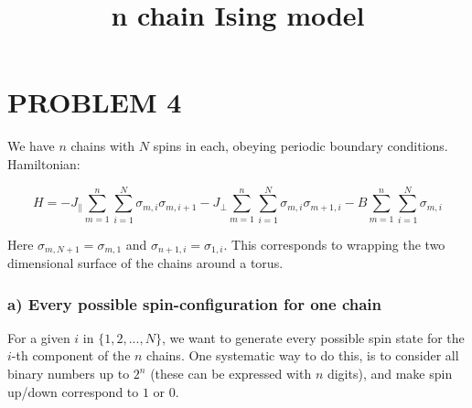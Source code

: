 \documentclass[11pt]{article}
\title{n chain Ising model}
\begin{document}
    
    
    \maketitle
    
    

    
    \section{PROBLEM 4}\label{problem-4}

    We have \(n\) chains with \(N\) spins in each, obeying periodic boundary
conditions. Hamiltonian:

\begin{equation}
    H=-J_{\parallel}\sum_{m=1}^{n}\sum_{i=1}^{N}\sigma_{m,i}\sigma_{m,i+1} - J_{\perp}\sum_{m=1}^{n}\sum_{i=1}^{N}\sigma_{m,i}\sigma_{m+1,i} -B\sum_{m=1}^{n}\sum_{i=1}^{N}\sigma_{m,i}
\end{equation}

Here \(\sigma_{m, N+1}=\sigma_{m, 1}\) and
\(\sigma_{n+1, i}=\sigma_{1, i}\). This corresponds to wrapping the two
dimensional surface of the chains around a torus.

    \subsubsection{a) Every possible spin-configuration for one
chain}\label{a-every-possible-spin-configuration-for-one-chain}

For a given \(i\) in \(\{1, 2, ..., N\}\), we want to generate every
possible spin state for the \(i\)-th component of the \(n\) chains. One
systematic way to do this, is to consider all binary numbers up to
\(2^{n}\) (these can be expressed with \(n\) digits), and make spin
up/down correspond to \(1\) or \(0\).
\end{document}
